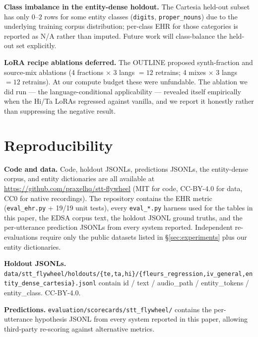 \documentclass[conference,a4paper]{IEEEtran}
\begin{document}
\textbf{Class imbalance in the entity-dense holdout.} The Cartesia held-out subset has only $0$--$2$ rows for some entity classes (\texttt{digits}, \texttt{proper\_nouns}) due to the underlying training corpus distribution; per-class EHR for those categories is reported as N/A rather than imputed. Future work will class-balance the held-out set explicitly.

\textbf{LoRA recipe ablations deferred.} The OUTLINE proposed synth-fraction and source-mix ablations (4 fractions $\times$ 3 langs $= 12$ retrains; 4 mixes $\times$ 3 langs $= 12$ retrains). At our compute budget these were unfundable. The ablation we did run --- the language-conditional applicability --- revealed itself empirically when the Hi/Ta LoRAs regressed against vanilla, and we report it honestly rather than suppressing the negative result.

\section{Reproducibility}\label{sec:reproducibility}

\textbf{Code and data.} Code, holdout JSONLs, predictions JSONLs, the entity-dense corpus, and entity dictionaries are all available at \url{https://github.com/praxelhq/stt-flywheel} (MIT for code, CC-BY-4.0 for data, CC0 for native recordings). The repository contains the EHR metric (\texttt{eval\_ehr.py} + 19/19 unit tests), every \texttt{eval\_*.py} harness used for the tables in this paper, the EDSA corpus text, the holdout JSONL ground truths, and the per-utterance prediction JSONLs from every system reported. Independent re-evaluations require only the public datasets listed in §\ref{sec:experiments} plus our entity dictionaries.

\textbf{Holdout JSONLs.} \texttt{data/\allowbreak stt\_flywheel/\allowbreak holdouts/\allowbreak \{te,ta,hi\}/\allowbreak \{fleurs\_regression,\allowbreak iv\_general,\allowbreak entity\_dense\_cartesia\}.jsonl} contain id / text / audio\_path / entity\_tokens / entity\_class. CC-BY-4.0.

\textbf{Predictions.} \texttt{evaluation/\allowbreak scorecards/\allowbreak stt\_flywheel/} contains the per-utterance hypothesis JSONL from every system reported in this paper, allowing third-party re-scoring against alternative metrics.
\end{document}
